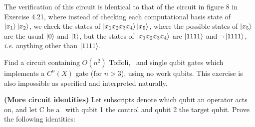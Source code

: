 \vspace{-10pt}
The verification of this circuit is identical to that of the circuit in figure 8 in Exercise 4.21, where instead of checking each computational basis state of $\ket{x_1}\ket{x_2}$, we check the states of $\ket{x_1x_2x_3x_4}\ket{x_5}$, where the possible states of $\ket{x_5}$ are the usual $\ket{0}$ and $\ket{1}$, but the states of $\ket{x_1x_2x_3x_4}$ are $\ket{1111}$ and $\neg\ket{1111}$, \textit{i.e.} anything other than $\ket{1111}$.

 Find a circuit containing $O(n^2)$ Toffoli, \CNOT\ and single qubit gates which implements a $C^n(X)$ gate (for $n>3$), using no work qubits.
\Soln This exercise is also impossible as specified and interpreted naturally.
\begin{comment}  A succinct proof is offered by Craig Gidney in various placed, in particular here: \href{_}\url{https://algassert.com/circuits/2015/06/05/Constructing-Large-Controlled-Nots.html}.  We summarize
\end{comment}
 \textbf{(More circuit identities)}  Let subscripts denote which qubit an operator acts on, and let C be a \CNOT\ with qubit 1 the control and qubit 2 the target qubit.  Prove the following identities:
